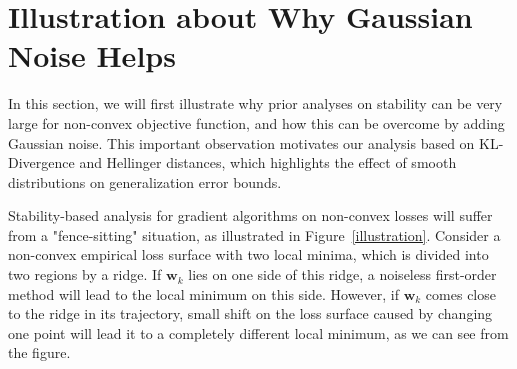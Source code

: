 \documentclass[final,12pt]{colt2018} %
\begin{document}
\section{Illustration about Why Gaussian Noise Helps}\label{section: graphical}
 In this section, we will first illustrate why prior analyses on stability can be very large for non-convex objective function, and how this can be overcome by adding Gaussian noise. This important observation motivates our analysis based on KL-Divergence and Hellinger distances, which highlights the effect of smooth distributions on generalization error bounds.

Stability-based analysis for gradient algorithms on non-convex losses will suffer from a "fence-sitting" situation, as illustrated in Figure~\ref{illustration}. Consider a non-convex empirical loss surface with two local minima, which is divided into two regions by a ridge. If $\bm{w}_k$ lies on one side of this ridge, a noiseless first-order method will lead to the local minimum on this side. However, if $\bm{w}_k$ comes close to the ridge in its trajectory, small shift on the loss surface caused by changing one point will lead it to a completely different local minimum, as we can see from the figure.
\end{document}
